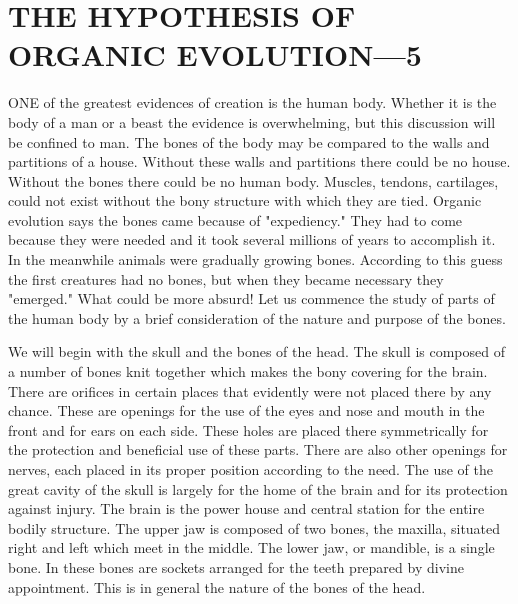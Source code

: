 \chapter{THE HYPOTHESIS OF ORGANIC EVOLUTION—5}

ONE of the greatest evidences of creation is the human body. Whether it is the body of a
man or a beast the evidence is overwhelming, but this discussion will be confined to man.
The bones of the body may be compared to the walls and partitions of a house. Without these
walls and partitions there could be no house. Without the bones there could be no human
body. Muscles, tendons, cartilages, could not exist without the bony structure with which
they are tied. Organic evolution says the bones came because of "expediency." They had to
come because they were needed and it took several millions of years to accomplish it. In the
meanwhile animals were gradually growing bones. According to this guess the first creatures
had no bones, but when they became necessary they "emerged." What could be more absurd!
Let us commence the study of parts of the human body by a brief consideration of the nature
and purpose of the bones.

We will begin with the skull and the bones of the head. The skull is composed of a number of
bones knit together which makes the bony covering for the brain. There are orifices in certain
places that evidently were not placed there by any chance. These are openings for the use of
the eyes and nose and mouth in the front and for ears on each side. These holes are placed
there symmetrically for the protection and beneficial use of these parts. There are also other
openings for nerves, each placed in its proper position according to the need. The use of the
great cavity of the skull is largely for the home of the brain and for its protection against
injury. The brain is the power house and central station for the entire bodily structure. The
upper jaw is composed of two bones, the maxilla, situated right and left which meet in the
middle. The lower jaw, or mandible, is a single bone. In these bones are sockets arranged for
the teeth prepared by divine appointment. This is in general the nature of the bones of the
head.

